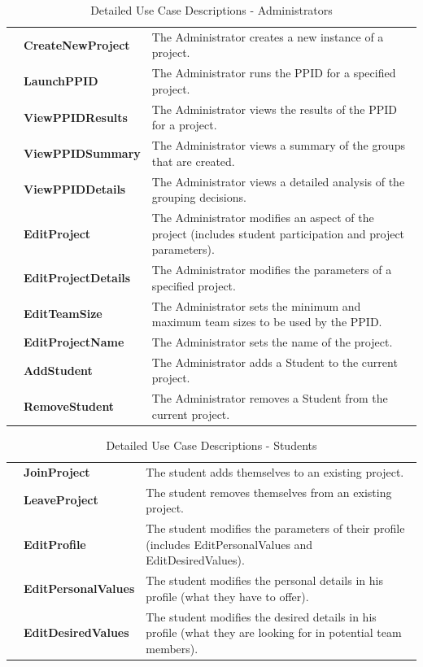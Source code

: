 \documentclass[12pt,letterpaper]{article}
\begin{document}
\begin{table}[H]
	\caption{Detailed Use Case Descriptions - Administrators}
	\vspace{1em}
	\begin{tabu} to 
		\createnewproject{} & CreateNewProject & The Administrator creates a new instance of a project.\\
		\launchppid{} & LaunchPPID & The Administrator runs the PPID for a specified project.\\
		\viewppidresults{} & ViewPPIDResults & The Administrator views the results of the PPID for a project. \\
		\viewppidsummary{} & ViewPPIDSummary & The Administrator views a summary of the groups that are created. \\
		\viewppiddetails{} & ViewPPIDDetails & The Administrator views a detailed analysis of the grouping decisions. \\
		\editproject{} & EditProject & The Administrator modifies an aspect of the project (includes student participation 
		and project parameters).\\
		\editprojectdetails{} & EditProjectDetails & The Administrator modifies the parameters of a specified project.\\
		\editteamsize{} & EditTeamSize & The Administrator sets the minimum and maximum team sizes to be used by the PPID. \\
		\editprojectname{} & EditProjectName & The Administrator sets the name of the project. \\
		\addstudent{} & AddStudent & The Administrator adds a Student to the current project.\\
		\removestudent{} & RemoveStudent & The Administrator removes a Student from the current project.\\
	\end{tabu}
\end{table}

\begin{table}[H]
	\caption{Detailed Use Case Descriptions - Students}
	\vspace{1em}
	\begin{tabu} to 
		\joinproject{} & JoinProject & The student adds themselves to an existing project.\\
		\leaveproject{} & LeaveProject & The student removes themselves from an existing project.\\
		\editprofile{} & EditProfile & The student modifies the parameters of their profile (includes EditPersonalValues and EditDesiredValues).\\
		\editpersonalvalues{} & EditPersonalValues & The student modifies the personal details in his profile (what they have to offer). \\
		\editdesiredvalues{} & EditDesiredValues & The student modifies the desired details in his profile (what they are looking for in 
		potential team members). \\
	\end{tabu}
\end{table}
\end{document}
